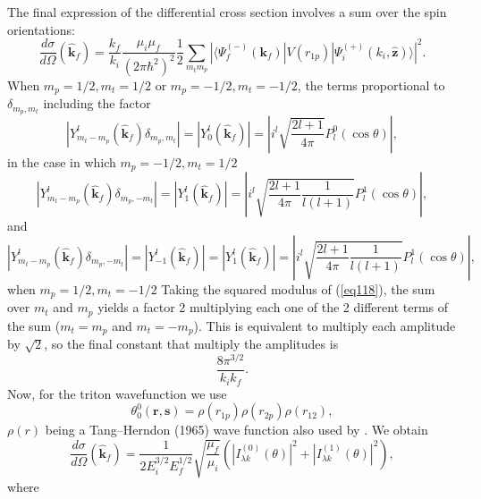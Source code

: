 The final expression of the differential cross section involves a sum over the spin orientations:
\begin{equation}\label{eq106}
\frac{d\sigma}{d\Omega}(\hat{\mathbf{k}}_f)=\frac{k_f}{k_i}\frac{\mu_i\mu_f}{(2\pi\hbar^2)^2}\frac{1}{2}\sum_{m_tm_p}|\langle \Psi_f^{(-)}(\mathbf{k}_f)|V(r_{1p})|\Psi_i^{(+)}(k_i,\hat {\mathbf{z}})\rangle|^2.
\end{equation}
When $m_p=1/2, m_t=1/2$ or $m_p=-1/2, m_t=-1/2$, the terms proportional to $\delta_{m_p,m_t}$  including the factor
\begin{equation}\label{eq107}
|Y_{m_t-m_p}^{l}(\hat{\mathbf{k}}_f)\delta_{m_p,m_t}|=|Y_{0}^{l}(\hat{\mathbf{k}}_f)|=
\left|i^l \sqrt{\frac{2l+1}{4\pi}}P_l^0(\cos\theta)\right|,
\end{equation}
in the case in which $m_p=-1/2, m_t=1/2$
\begin{equation}\label{eq108}
|Y_{m_t-m_p}^{l}(\hat{\mathbf{k}}_f)\delta_{m_p,-m_t}|=|Y_{1}^{l}(\hat{\mathbf{k}}_f)|=
\left|i^l \sqrt{\frac{2l+1}{4\pi}\frac{1}{l(l+1)}}P_l^1(\cos\theta)\right|,
\end{equation}
and
\begin{equation}\label{eq109}
|Y_{m_t-m_p}^{l}(\hat{\mathbf{k}}_f)\delta_{m_p,-m_t}|=|Y_{-1}^{l}(\hat{\mathbf{k}}_f)|=|Y_{1}^{l}(\hat{\mathbf{k}}_f)|
=\left|i^l \sqrt{\frac{2l+1}{4\pi}\frac{1}{l(l+1)}}P_l^1(\cos\theta)\right|,
\end{equation}
 when $m_p=1/2, m_t=-1/2$
Taking the squared modulus of (\ref{eq118}), the sum over $m_t$ and $m_p$ yields a factor 2 multiplying each one of the 2 different terms of the sum ($m_t=m_p$ and $m_t=-m_p$). This is equivalent to multiply each amplitude by $\sqrt{2}$, so the final constant that multiply the amplitudes is
\begin{equation}\label{eq238}
\frac{8\pi^{3/2}}{k_ik_f}.
\end{equation}
Now, for the triton wavefunction we use	
\begin{equation}\label{eq188}
\theta_0^0(\mathbf{r},\mathbf{s})=\rho(r_{1p})\rho(r_{2p})\rho(r_{12}),
\end{equation}
 $\rho(r)$ being a Tang--Herndon (1965) wave function also used by  \cite{Bayman:71}.
We obtain
\begin{equation}\label{eq110}
\frac{d\sigma}{d\Omega}(\hat{\mathbf{k}}_f)=\frac{1}{2 E_i^{3/2} E_f^{1/2}}\sqrt{\frac{\mu_f}{\mu_i}}\left(|I_{\lambda k}^{(0)}(\theta)|^2+|I_{\lambda k}^{(1)}(\theta)|^2\right),
\end{equation}
where
